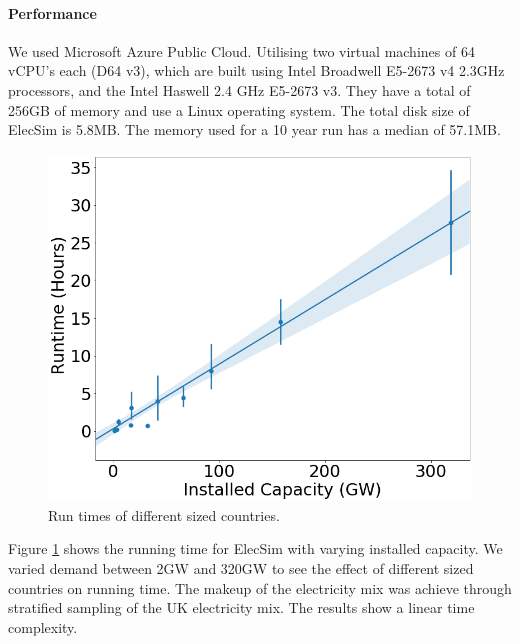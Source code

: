 \paragraph{Performance}

 We used Microsoft Azure Public Cloud. Utilising two virtual machines of 64 vCPU's each (D64 v3), which are built using Intel Broadwell E5-2673 v4 2.3GHz processors, and the Intel Haswell 2.4 GHz E5-2673 v3. They have a total of 256GB of memory and use a Linux operating system. The total disk size of ElecSim is 5.8MB. The memory used for a 10 year run has a median of 57.1MB.


\begin{figure}
	\centering
	\includegraphics[width=0.7\linewidth]{figures/timing_plot_smaller.png}
	\caption{Run times of different sized countries.}
	\label{fig:timingplot}
	\vskip -0.5cm
\end{figure}


Figure \ref{fig:timingplot} shows the running time for ElecSim with varying installed capacity. We varied demand between 2GW and 320GW to see the effect of different sized countries on running time. The makeup of the electricity mix was achieve through stratified sampling of the UK electricity mix. The results show a linear time complexity. 



